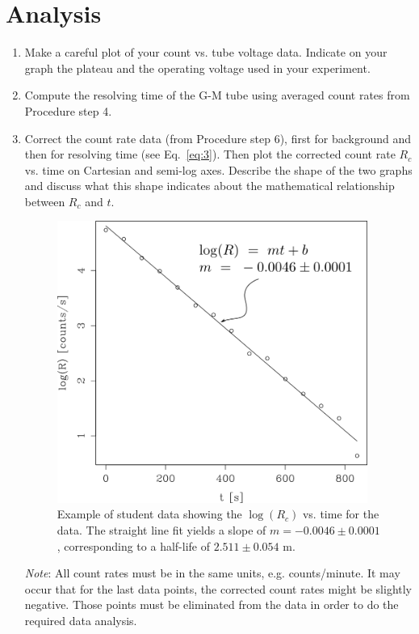 \section{Analysis}

\begin{enumerate}
\item Make a careful plot of your count vs. tube voltage data.
Indicate on your graph the plateau and the operating voltage used in
your experiment.

\item Compute the resolving time of the G-M tube using averaged count
rates from Procedure step 4.

\item Correct the \bam count rate data (from Procedure step 6), first
for background and then for resolving time (see Eq.~\ref{eq:3}).  Then plot
the corrected count rate $R_{c}$ vs. time on
Cartesian and semi-log axes.  Describe the shape of the two graphs
and discuss what this shape indicates about the mathematical
relationship between $R_{c}$ and $t$.
\begin{figure}
\begin{centering}
\includegraphics[width=4in]{../images/ba137m.png}
\caption{Example of student data showing the $\log(R_c)$ vs. time for the \bam data.  The straight line fit yields a slope of $m=-0.0046\pm0.0001$, corresponding to a \bam half-life of $2.511\pm0.054$ m. }
\label{fig:rate-V}
\end{centering}
\end{figure}

{\em Note}: All count rates must be in the same units, e.g. counts/minute. 
It may occur that for the last data points, the corrected count
rates might be slightly negative.  Those points must be eliminated
from the data in order to do the required data analysis.


\end{enumerate}
